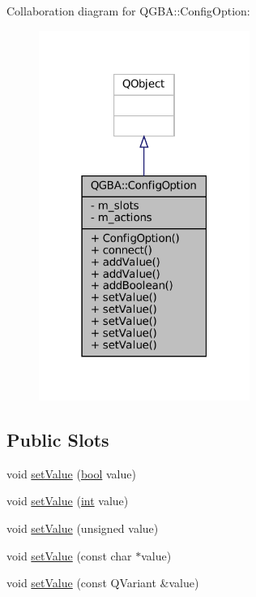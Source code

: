 Collaboration diagram for Q\+G\+BA\+:\+:Config\+Option\+:
\nopagebreak
\begin{figure}[H]
\begin{center}
\leavevmode
\includegraphics[width=195pt]{class_q_g_b_a_1_1_config_option__coll__graph}
\end{center}
\end{figure}
\subsection*{Public Slots}
\begin{DoxyCompactItemize}
\item 
void \mbox{\hyperlink{class_q_g_b_a_1_1_config_option_a91abdb09b8bb65ff7c16c69e4f694e7b}{set\+Value}} (\mbox{\hyperlink{libretro_8h_a4a26dcae73fb7e1528214a068aca317e}{bool}} value)
\item 
void \mbox{\hyperlink{class_q_g_b_a_1_1_config_option_a38e726eff29e2178fbad58c12104ae32}{set\+Value}} (\mbox{\hyperlink{ioapi_8h_a787fa3cf048117ba7123753c1e74fcd6}{int}} value)
\item 
void \mbox{\hyperlink{class_q_g_b_a_1_1_config_option_a2b7c4b60aa27d09db06b13e73565991e}{set\+Value}} (unsigned value)
\item 
void \mbox{\hyperlink{class_q_g_b_a_1_1_config_option_a1d04fcf2f4a620fc582b0da1156699e6}{set\+Value}} (const char $\ast$value)
\item 
void \mbox{\hyperlink{class_q_g_b_a_1_1_config_option_a18dc4971608d3519c0fbb69bfa6590fb}{set\+Value}} (const Q\+Variant \&value)
\end{DoxyCompactItemize}
